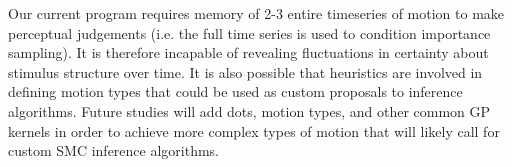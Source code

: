 \documentclass{scrartcl}
\begin{document}
Our current program requires memory of 2-3 entire timeseries of motion to make perceptual judgements (i.e. the full time series is used to condition importance sampling). It is therefore incapable of revealing fluctuations in certainty about stimulus structure over time. It is also possible that heuristics are involved in defining motion types that could be used as custom proposals to inference algorithms. Future studies will add dots, motion types, and other common GP kernels in order to achieve more complex types of motion that will likely call for custom SMC inference algorithms. 



\end{document}
